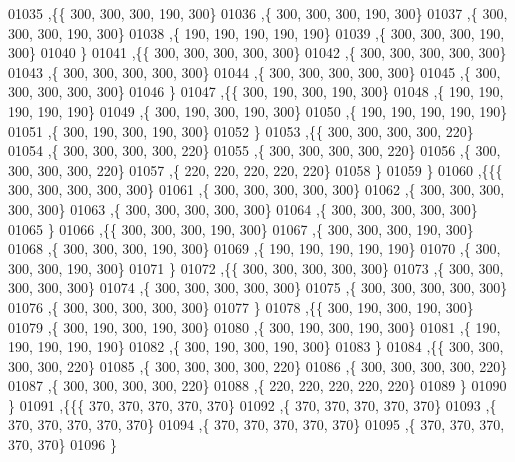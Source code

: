 \begin{DoxyCode}
01035   ,\{\{   300,   300,   300,   190,   300\}
01036    ,\{   300,   300,   300,   190,   300\}
01037    ,\{   300,   300,   300,   190,   300\}
01038    ,\{   190,   190,   190,   190,   190\}
01039    ,\{   300,   300,   300,   190,   300\}
01040    \}
01041   ,\{\{   300,   300,   300,   300,   300\}
01042    ,\{   300,   300,   300,   300,   300\}
01043    ,\{   300,   300,   300,   300,   300\}
01044    ,\{   300,   300,   300,   300,   300\}
01045    ,\{   300,   300,   300,   300,   300\}
01046    \}
01047   ,\{\{   300,   190,   300,   190,   300\}
01048    ,\{   190,   190,   190,   190,   190\}
01049    ,\{   300,   190,   300,   190,   300\}
01050    ,\{   190,   190,   190,   190,   190\}
01051    ,\{   300,   190,   300,   190,   300\}
01052    \}
01053   ,\{\{   300,   300,   300,   300,   220\}
01054    ,\{   300,   300,   300,   300,   220\}
01055    ,\{   300,   300,   300,   300,   220\}
01056    ,\{   300,   300,   300,   300,   220\}
01057    ,\{   220,   220,   220,   220,   220\}
01058    \}
01059   \}
01060  ,\{\{\{   300,   300,   300,   300,   300\}
01061    ,\{   300,   300,   300,   300,   300\}
01062    ,\{   300,   300,   300,   300,   300\}
01063    ,\{   300,   300,   300,   300,   300\}
01064    ,\{   300,   300,   300,   300,   300\}
01065    \}
01066   ,\{\{   300,   300,   300,   190,   300\}
01067    ,\{   300,   300,   300,   190,   300\}
01068    ,\{   300,   300,   300,   190,   300\}
01069    ,\{   190,   190,   190,   190,   190\}
01070    ,\{   300,   300,   300,   190,   300\}
01071    \}
01072   ,\{\{   300,   300,   300,   300,   300\}
01073    ,\{   300,   300,   300,   300,   300\}
01074    ,\{   300,   300,   300,   300,   300\}
01075    ,\{   300,   300,   300,   300,   300\}
01076    ,\{   300,   300,   300,   300,   300\}
01077    \}
01078   ,\{\{   300,   190,   300,   190,   300\}
01079    ,\{   300,   190,   300,   190,   300\}
01080    ,\{   300,   190,   300,   190,   300\}
01081    ,\{   190,   190,   190,   190,   190\}
01082    ,\{   300,   190,   300,   190,   300\}
01083    \}
01084   ,\{\{   300,   300,   300,   300,   220\}
01085    ,\{   300,   300,   300,   300,   220\}
01086    ,\{   300,   300,   300,   300,   220\}
01087    ,\{   300,   300,   300,   300,   220\}
01088    ,\{   220,   220,   220,   220,   220\}
01089    \}
01090   \}
01091  ,\{\{\{   370,   370,   370,   370,   370\}
01092    ,\{   370,   370,   370,   370,   370\}
01093    ,\{   370,   370,   370,   370,   370\}
01094    ,\{   370,   370,   370,   370,   370\}
01095    ,\{   370,   370,   370,   370,   370\}
01096    \}

\end{DoxyCode}
